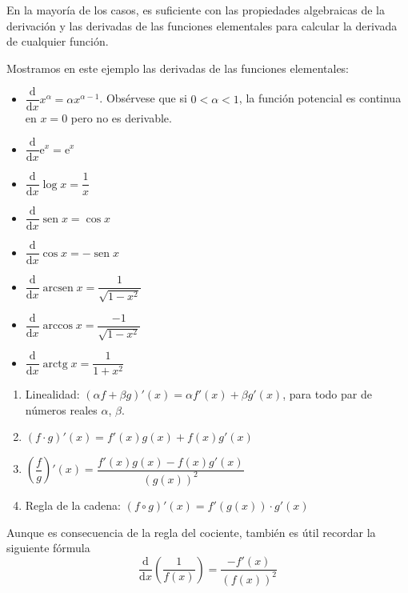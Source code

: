 En la mayoría de los casos, es suficiente con las propiedades algebraicas de la derivación y las derivadas de las funciones elementales para calcular la derivada de cualquier función.

\begin{ejemplo}
Mostramos en este ejemplo las derivadas de las funciones elementales:
\begin{itemize}
\item
$\dfrac{\mathrm{d}}{\mathrm{d}x}x^\alpha = \alpha x^{\alpha-1}$. Obsérvese que si $0<\alpha<1$, la función potencial es continua en $x=0$ pero no es derivable.
\item
$\dfrac{\mathrm{d}}{\mathrm{d}x}\mathrm{e}^x=\mathrm{e}^x$
\item
$\dfrac{\mathrm{d}}{\mathrm{d}x}\log x=\dfrac1x$
\item
$\dfrac{\mathrm{d}}{\mathrm{d}x}\operatorname{sen} x=\cos x$
\item
$\dfrac{\mathrm{d}}{\mathrm{d}x}\cos x=-\operatorname{sen} x$
\item
$\dfrac{\mathrm{d}}{\mathrm{d}x}\operatorname{arcsen} x = \dfrac1{\sqrt{1-x^2}}$
\item
$\dfrac{\mathrm{d}}{\mathrm{d}x}\arccos x = \dfrac{-1}{\sqrt{1-x^2}}$
\item
$\dfrac{\mathrm{d}}{\mathrm{d}x}\operatorname{arctg} x = \dfrac{1}{1+x^2}$\fej
\end{itemize}
\end{ejemplo}

\begin{proposicion-br}
\begin{enumerate}
\item
Linealidad:\quad  
$(\alpha f+\beta g)'(x)=\alpha f'(x)+\beta g'(x)$, para todo par de números reales $\alpha$, $\beta$.
\item
$(f\cdot g)'(x) = f'(x)g(x)+f(x)g'(x)$
\item
$\left(\dfrac f g \right)'(x)=\dfrac{f'(x)g(x)-f(x)g'(x)}{(g(x))^2}$
\item
Regla de la cadena:\quad
$(f\circ g)'(x) = f'(g(x))\cdot g'(x)$
\end{enumerate}
\end{proposicion-br}

Aunque es consecuencia de la regla del cociente, también es útil recordar la siguiente fórmula
\[
\dfrac{\mathrm{d}}{\mathrm{d}x}\left(\dfrac1{f(x)}\right)=\dfrac{-f'(x)}{(f(x))^2}
\]

